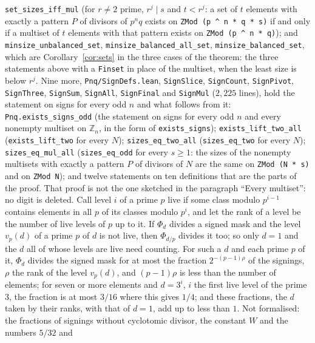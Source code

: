 \documentclass[11pt,a4paper]{amsart}
\theoremstyle{definition}
\theoremstyle{remark}
\newcommand{\Z}{\mathbb{Z}}
\newcommand{\lean}[1]{\texttt{#1}}
\begin{document}
\lean{set\_sizes\_iff\_mul} (for $r\ne2$ prime, $r^j\mid s$ and $t<r^j$: a set of $t$ elements with exactly a pattern $P$ of divisors of $p^nq$ exists on \lean{ZMod (p \^{} n * q * s)} if and only if a multiset of $t$ elements with that pattern exists on \lean{ZMod (p \^{} n * q)}); and
\lean{minsize\_unbalanced\_set}, \lean{minsize\_balanced\_all\_set}, \lean{minsize\_balanced\_set}, which are Corollary~\ref{cor:sets} in the three cases of the theorem: the three statements above with a \lean{Finset} in place of the multiset, when the least size is below $r^j$.
Nine more, \lean{Pnq/SignDefs.lean}, \lean{SignSlice}, \lean{SignCount}, \lean{SignPivot}, \lean{SignThree}, \lean{SignSum},
\lean{SignAll}, \lean{SignFinal} and \lean{SignMul} ($2{,}225$ lines), hold the statement on signs for every odd $n$ and what
follows from it: \lean{Pnq.exists\_signs\_odd} (the statement on signs for every odd $n$ and every nonempty multiset on
$\Z_n$, in the form of \lean{exists\_signs}); \lean{exists\_lift\_two\_all} (\lean{exists\_lift\_two} for every $N$);
\lean{sizes\_eq\_two\_all} (\lean{sizes\_eq\_two} for every $N$); \lean{sizes\_eq\_mul\_all} (\lean{sizes\_eq\_odd} for
every $s\ge1$: the sizes of the nonempty multisets with exactly a pattern $P$ of divisors of $N$ are the same on
\lean{ZMod (N * s)} and on \lean{ZMod N}); and twelve statements on ten definitions that are the parts of the proof.
That proof is not the one sketched in the paragraph ``Every multiset'': no digit is deleted. Call level $i$ of a
prime $p$ live if some class modulo $p^{i-1}$ contains elements in all $p$ of its classes modulo $p^i$, and let the
rank of a level be the number of live levels of $p$ up to it. If $\Phi_d$ divides a signed mask and the level
$v_p(d)$ of a prime $p$ of $d$ is not live, then $\Phi_{d/p}$ divides it too; so only $d=1$ and the $d$ all of whose
levels are live need counting. For such a $d$ and each prime $p$ of it, $\Phi_d$ divides the signed mask for at most
the fraction $2^{-(p-1)\rho}$ of the signings, $\rho$ the rank of the level $v_p(d)$, and $(p-1)\rho$ is less than the
number of elements; for seven or more elements and $d=3^i$, $i$ the first live level of the prime $3$, the fraction is at most
$3/16$ where this gives $1/4$; and these fractions, the $d$ taken by their ranks, with that of $d=1$, add up to less than $1$.
Not formalised: the fractions of signings without cyclotomic divisor, the constant $W$ and the numbers $5/32$ and
\end{document}
